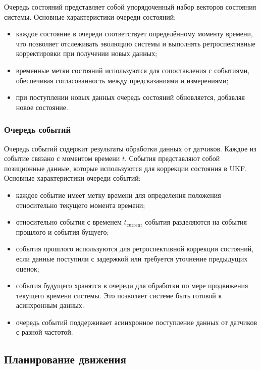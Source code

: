 Очередь состояний представляет собой упорядоченный набор векторов состояния системы.
Основные характеристики очереди состояний:
\begin{itemize}
    \item каждое состояние в очереди соответствует определённому моменту времени, что позволяет отслеживать эволюцию системы и выполнять ретроспективные корректировки при получении новых данных;
    \item временные метки состояний используются для сопоставления с событиями, обеспечивая согласованность между предсказаниями и измерениями;
    \item при поступлении новых данных очередь состояний обновляется, добавляя новое состояние.
\end{itemize}

\subsubsection{Очередь событий}
\label{subsec:event_queue}
\hfill

Очередь событий содержит результаты обработки данных от датчиков. Каждое из событие связано с моментом времени $t$.
События представляют собой позиционные данные, которые используются для коррекции состояния в UKF.
Основные характеристики очереди событий:
\begin{itemize}
    \item каждое событие имеет метку времени для определения положения относительно текущего момента времени;
    \item относительно события с временем $t_{\text{current}}$ события разделяются на события прошлого и события бущуего;
    \item события прошлого используются для ретроспективной коррекции состояний, если данные поступили с задержкой или требуется уточнение предыдущих оценок;
    \item события будущего хранятся в очереди для обработки по мере продвижения текущего времени системы. Это позволяет системе быть готовой к асинхронным данных.
    \item очередь событий поддерживает асинхронное поступление данных от датчиков с разной частотой. 
\end{itemize}

\subsection{Планирование движения}


